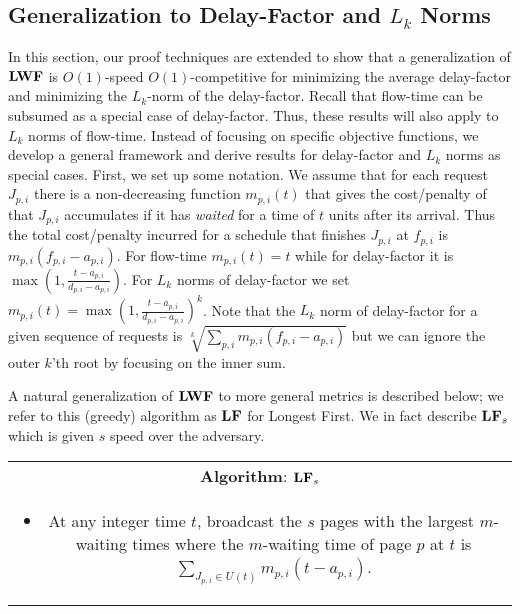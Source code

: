 \documentclass[11pt]{article}
\newcommand{\grdy}{\Algorithm{LF}}
\begin{document}
\begin{titlepage}
\section{Generalization to Delay-Factor and  $L_k$ Norms}\vspace{-1mm}
\label{sec:metrics} \vspace{-2mm} In this section, our proof
techniques are extended to show that a generalization of ${\texttt{\bf{LWF}}}$ is
$O(1)$-speed $O(1)$-competitive for minimizing the average
delay-factor and minimizing the $L_k$-norm of the delay-factor.
Recall that flow-time can be subsumed as a special case of
delay-factor. Thus, these results will also apply to $L_k$ norms of
flow-time. Instead of focusing on specific objective functions, we
develop a general framework and derive results for delay-factor and
$L_k$ norms as special cases. First, we set up some notation. We
assume that for each request $J_{p,i}$ there is a non-decreasing
function $m_{p,i}(t)$ that gives the cost/penalty of that $J_{p,i}$
accumulates if it has {\em waited} for a time of $t$ units after its
arrival. Thus the total cost/penalty incurred for a schedule that
finishes $J_{p,i}$ at $f_{p,i}$ is $m_{p,i}(f_{p,i} -a_{p,i})$. For
flow-time $m_{p,i}(t) = t$ while for delay-factor it is $\max (1,
\frac{t-a_{p,i}}{d_{p,i} - a_{p,i}})$. For $L_k$ norms of delay-factor
we set $m_{p,i}(t) = \max (1, \frac{t-a_{p,i}}{d_{p,i} - a_{p,i}})^k$.
Note that the $L_k$ norm of delay-factor for a given sequence of
requests is $\sqrt[k]{\sum_{p,i} m_{p,i}(f_{p,i}-a_{p,i})}$ but we can
ignore the outer $k$'th root by focusing on the inner sum.

A natural generalization of ${\texttt{\bf{LWF}}}$ to more general metrics is described below; we refer to this (greedy) algorithm as
$\grdy$ for Longest First. We in fact describe $\grdy_s$ which is given $s$ speed over the adversary. \vspace{-2mm}
\begin{center}
\begin{tabular}[r]{|c|}
\hline
\textbf{Algorithm}: $\grdy_s$ \\
\begin{minipage}{\textwidth}
\begin{itemize}
\item At any integer time $t$, broadcast the $s$ pages with the
largest $m$-waiting times where the $m$-waiting time of page $p$ at $t$
 is  $\sum_{J_{p,i} \in U(t)} m_{p,i}(t -a_{p,i})$.
\end{itemize}
\end{minipage}\\
\hline
\end{tabular}
\end{center}


\end{titlepage}
\end{document}
